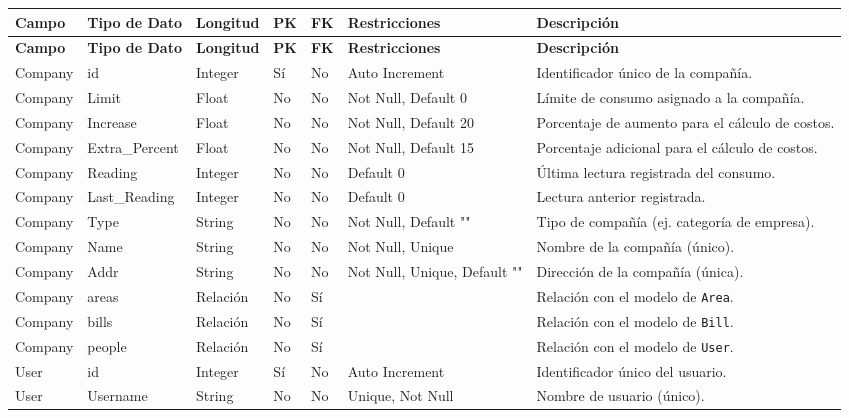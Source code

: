 \documentclass[12pt]{article}
\begin{document}
\begin{longtable}{|l|l|l|l|l|l|l|}
    \toprule
    \textbf{Campo} & \textbf{Tipo de Dato} & \textbf{Longitud} & \textbf{PK} & \textbf{FK} & \textbf{Restricciones} & \textbf{Descripción} \\
    \midrule
    \endfirsthead
    \toprule
    \textbf{Campo} & \textbf{Tipo de Dato} & \textbf{Longitud} & \textbf{PK} & \textbf{FK} & \textbf{Restricciones} & \textbf{Descripción} \\
    \midrule
    \endhead
    \midrule
    \endfoot
    \bottomrule
    \endlastfoot
    
    Company & id & Integer & Sí & No & Auto Increment & Identificador único de la compañía. \\
    \hline
    Company & Limit & Float & No & No & Not Null, Default 0 & Límite de consumo asignado a la compañía. \\
    \hline
    Company & Increase & Float & No & No & Not Null, Default 20 & Porcentaje de aumento para el cálculo de costos. \\
    \hline
    Company & Extra\_Percent & Float & No & No & Not Null, Default 15 & Porcentaje adicional para el cálculo de costos. \\
    \hline
    Company & Reading & Integer & No & No & Default 0 & Última lectura registrada del consumo. \\
    \hline
    Company & Last\_Reading & Integer & No & No & Default 0 & Lectura anterior registrada. \\
    \hline
    Company & Type & String & No & No & Not Null, Default "" & Tipo de compañía (ej. categoría de empresa). \\
    \hline
    Company & Name & String & No & No & Not Null, Unique & Nombre de la compañía (único). \\
    \hline
    Company & Addr & String & No & No & Not Null, Unique, Default "" & Dirección de la compañía (única). \\
    \hline
    Company & areas & Relación & No & Sí & & Relación con el modelo de \texttt{Area}. \\
    \hline
    Company & bills & Relación & No & Sí & & Relación con el modelo de \texttt{Bill}. \\
    \hline
    Company & people & Relación & No & Sí & & Relación con el modelo de \texttt{User}. \\
    \hline
    User & id & Integer & Sí & No & Auto Increment & Identificador único del usuario. \\
    \hline
    User & Username & String & No & No & Unique, Not Null & Nombre de usuario (único). \\

\end{longtable}
\end{document}
